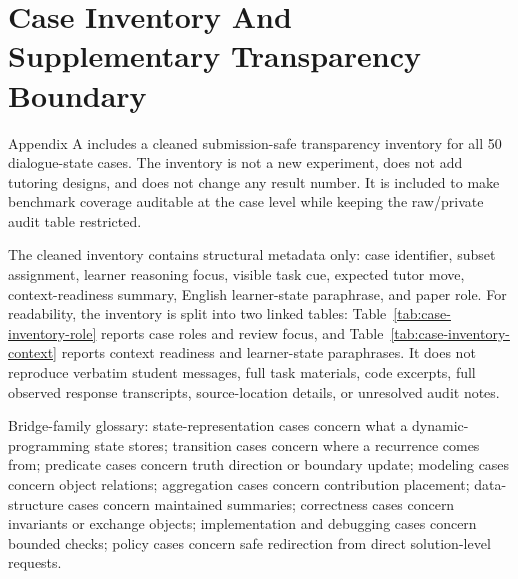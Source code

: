 \documentclass[11pt]{article}
\begin{document}
\section{Case Inventory And Supplementary Transparency Boundary}

Appendix A includes a cleaned submission-safe transparency inventory for all 50 dialogue-state cases. The inventory is not a new experiment, does not add tutoring designs, and does not change any result number. It is included to make benchmark coverage auditable at the case level while keeping the raw/private audit table restricted.

The cleaned inventory contains structural metadata only: case identifier, subset assignment, learner reasoning focus, visible task cue, expected tutor move, context-readiness summary, English learner-state paraphrase, and paper role. For readability, the inventory is split into two linked tables: Table~\ref{tab:case-inventory-role} reports case roles and review focus, and Table~\ref{tab:case-inventory-context} reports context readiness and learner-state paraphrases. It does not reproduce verbatim student messages, full task materials, code excerpts, full observed response transcripts, source-location details, or unresolved audit notes.

Bridge-family glossary: state-representation cases concern what a dynamic-programming state stores; transition cases concern where a recurrence comes from; predicate cases concern truth direction or boundary update; modeling cases concern object relations; aggregation cases concern contribution placement; data-structure cases concern maintained summaries; correctness cases concern invariants or exchange objects; implementation and debugging cases concern bounded checks; policy cases concern safe redirection from direct solution-level requests.
\end{document}
